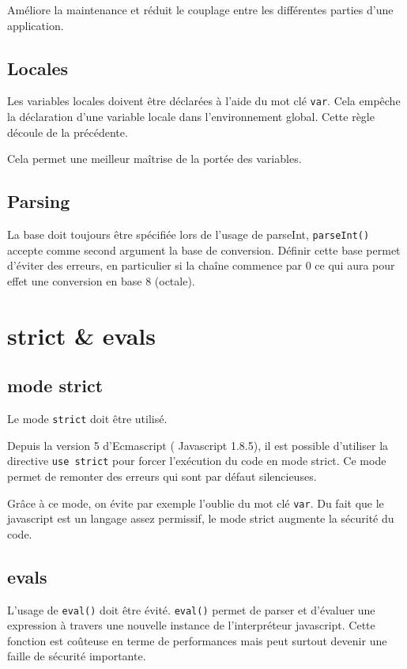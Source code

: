 			Améliore la maintenance et réduit le couplage entre les différentes parties d'une application.

		\subsection{Locales}
			Les variables locales doivent être déclarées à l'aide du mot clé \verb+var+. Cela empêche la déclaration d'une variable locale dans l'environnement global. Cette règle découle de la précédente.

			Cela permet une meilleur maîtrise de la portée des variables.

		\subsection{Parsing}
			La base doit toujours être spécifiée lors de l'usage de parseInt, \verb+parseInt()+ accepte comme second argument la base de conversion. Définir cette base permet d'éviter des erreurs, en particulier si la chaîne commence par 0 ce qui aura pour effet une conversion en base 8 (octale).

	\section{strict \& evals}
		\subsection{mode strict}
			Le mode \verb+strict+ doit être utilisé.

			Depuis la version 5 d'Ecmascript ( Javascript 1.8.5), il est possible d'utiliser la directive \verb+use strict+ pour forcer l'exécution du code en mode strict. Ce mode permet de remonter des erreurs qui sont par défaut silencieuses.

			Grâce à ce mode, on évite par exemple l'oublie du mot clé \verb+var+. Du fait que le javascript est un langage assez permissif, le mode strict augmente la sécurité du code.

		\subsection{evals}
			L'usage de \verb+eval()+ doit être évité. \verb+eval()+ permet de parser et d'évaluer une expression à travers une nouvelle instance de l'interpréteur javascript. Cette fonction est coûteuse en terme de performances mais peut surtout devenir une faille de sécurité importante.

